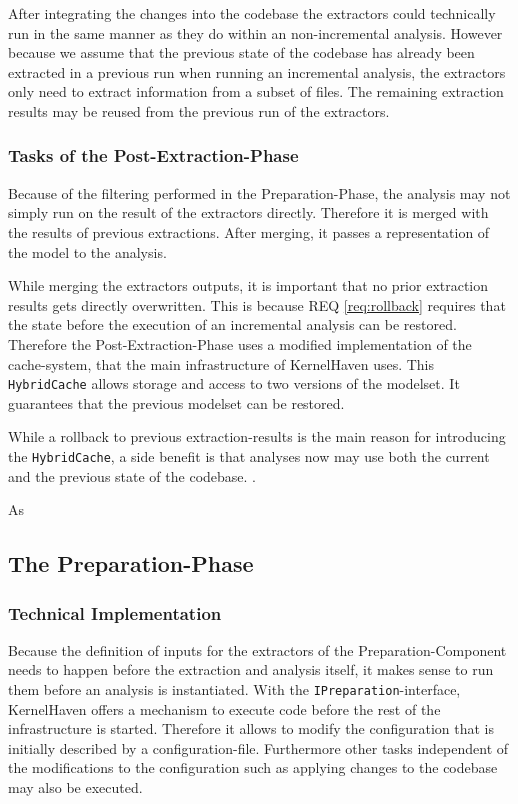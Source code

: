 \documentclass[a4paper]{article}
\begin{document}
After integrating the changes into the codebase the extractors could technically run in the same manner as they do within an non-incremental analysis. However because we assume that the previous state of the codebase has already been extracted in a previous run when running an incremental analysis, the extractors only need to extract information from a subset of files. The remaining extraction results may be reused from the previous run of the extractors.

\subsubsection{Tasks of the Post-Extraction-Phase}

Because of the filtering performed in the Preparation-Phase, the analysis may not simply run on the result of the extractors directly. Therefore it is merged with the results of previous extractions. After merging, it passes a representation of the model to the analysis.

While merging the extractors outputs, it is important that no prior extraction results gets directly overwritten. This is because REQ \ref{req:rollback} requires that the state before the execution of an incremental analysis can be restored. Therefore the Post-Extraction-Phase uses a modified implementation of the cache-system, that the main infrastructure of KernelHaven uses. This \texttt{HybridCache} allows storage and access to two versions of the modelset. It guarantees that the previous modelset can be restored.

While a rollback to previous extraction-results is the main reason for introducing the \texttt{HybridCache}, a side benefit is that analyses now may use both the current and the previous state of the codebase. .

As 


\subsection{The Preparation-Phase}

\subsubsection{Technical Implementation}

Because the definition of inputs for the extractors of the Preparation-Component needs to happen before the extraction and analysis itself, it makes sense to run them before an analysis is instantiated. With the \texttt{IPreparation}-interface, KernelHaven offers a mechanism to execute code before the rest of the infrastructure is started. Therefore it allows to modify the configuration that is initially described by a configuration-file. Furthermore other tasks independent of the modifications to the configuration such as applying changes to the codebase may also be executed.
\end{document}
